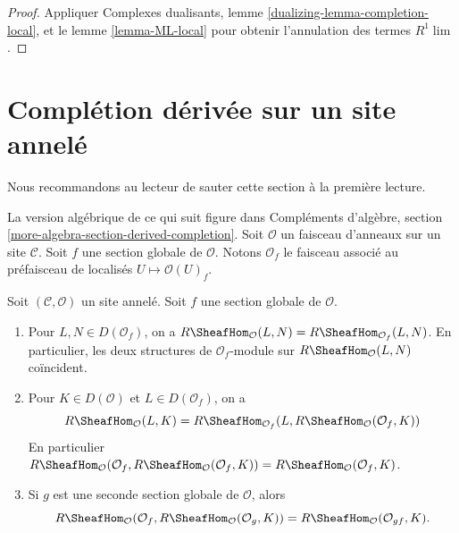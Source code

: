 \begin{proof}
Appliquer Complexes dualisants, lemme \ref{dualizing-lemma-completion-local},
et le lemme \ref{lemma-ML-local} pour obtenir l'annulation des termes $R^1\lim$.
\end{proof}








\section{Complétion dérivée sur un site annelé}
\label{section-derived-completion}

\noindent
Nous recommandons au lecteur de sauter cette section à la première lecture.

\medskip\noindent
La version algébrique de ce qui suit figure dans
Compléments d'algèbre, section \ref{more-algebra-section-derived-completion}.
Soit $\mathcal{O}$ un faisceau d'anneaux sur un site $\mathcal{C}$.
Soit $f$ une section globale de $\mathcal{O}$. Notons
$\mathcal{O}_f$ le faisceau associé au préfaisceau de localisés
$U \mapsto \mathcal{O}(U)_f$.

\begin{lemma}
\label{lemma-map-twice-localize}
Soit $(\mathcal{C}, \mathcal{O})$ un site annelé. Soit $f$ une section
globale de $\mathcal{O}$.
\begin{enumerate}
\item Pour $L, N \in D(\mathcal{O}_f)$, on a
$R\SheafHom_\mathcal{O}(L, N) = R\SheafHom_{\mathcal{O}_f}(L, N)$.
En particulier, les deux structures de $\mathcal{O}_f$-module sur
$R\SheafHom_\mathcal{O}(L, N)$ coïncident.
\item Pour $K \in D(\mathcal{O})$ et
$L \in D(\mathcal{O}_f)$, on a
$$
R\SheafHom_\mathcal{O}(L, K) =
R\SheafHom_{\mathcal{O}_f}(L, R\SheafHom_\mathcal{O}(\mathcal{O}_f, K))
$$
En particulier
$R\SheafHom_\mathcal{O}(\mathcal{O}_f,
R\SheafHom_\mathcal{O}(\mathcal{O}_f, K)) =
R\SheafHom_\mathcal{O}(\mathcal{O}_f, K)$.
\item Si $g$ est une seconde section
globale de $\mathcal{O}$, alors
$$
R\SheafHom_\mathcal{O}(\mathcal{O}_f, R\SheafHom_\mathcal{O}(\mathcal{O}_g, K))
= R\SheafHom_\mathcal{O}(\mathcal{O}_{gf}, K).
$$
\end{enumerate}
\end{lemma}

